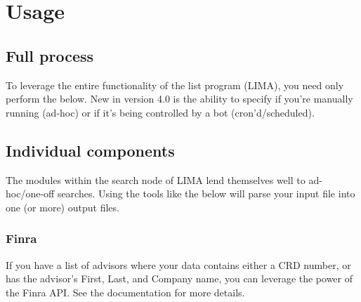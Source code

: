 \documentclass[letterpaper,10pt,english]{sphinxmanual}
\begin{document}
\section{Usage}
\label{\detokenize{index:usage}}

\subsection{Full process}
\label{\detokenize{index:full-process}}
To leverage the entire functionality of the list program (LIMA), you need only perform the below.
New in version 4.0 is the ability to specify if you’re manually running (ad-hoc) or if it’s being controlled by a bot (cron’d/scheduled).

%
\begin{sphinxVerbatim}[commandchars=\\\{\}]
   

  

  
\end{sphinxVerbatim}


\subsection{Individual components}
\label{\detokenize{index:individual-components}}
The modules within the search node of LIMA lend themselves well to ad-hoc/one-off searches. Using the tools like the below will parse your input file into one (or more) output files.


\subsubsection{Finra}
\label{\detokenize{index:finra}}
If you have a list of advisors where your data contains either a CRD number, or has the advisor’s First, Last, and Company name, you can leverage the power of the Finra API. See the documentation for more details.
\end{document}
